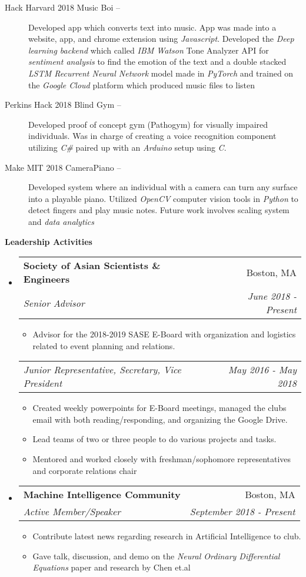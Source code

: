 \documentclass[letterpaper, 8pt]{extarticle}
\makeatletter
\newcommand{\resitem}[1]{\item #1 \vspace{-2pt}}
\newcommand{\resheading}[1]{{\large \colorbox{mygrey}{\begin{minipage}{0.99\textwidth}{\textbf{#1 \vphantom{p\^{E}}}}\end{minipage}}}}
\newcommand{\ressubheading}[4]{
\begin{tabular*}{7.40in}{l@{\extracolsep{\fill}}r}
		\textbf{#1} & #2 \\
		\textit{#3} & \textit{#4} \\
\end{tabular*}\vspace{-6pt}}
\newcommand{\rehead}[2]{
\begin{tabular*}{7.40in}{l@{\extracolsep{\fill}}r}
        \textit{#1} & \textit{#2} \\
\end{tabular*}\vspace{-6pt}}
\makeatother
\begin{document}
\begin{description}
\item[Hack Harvard 2018 Music Boi --] Developed app which converts text into music. App was made into a website, app, and chrome extension using \emph{Javascript}. Developed the \emph{Deep learning backend} which called \emph{IBM Watson} Tone Analyzer API for \emph{sentiment analysis} to find the emotion of the text and a double stacked \emph{LSTM Recurrent Neural Network} model made in \emph{PyTorch} and trained on the \emph{Google Cloud} platform which produced music files to listen

\item[Perkins Hack 2018 Blind Gym --]  Developed proof of concept gym (Pathogym) for visually impaired individuals. Was in charge of creating a voice recognition component utilizing \emph{C\#} paired up with an \emph{Arduino} setup using \emph{C}.

\item[Make MIT 2018 CameraPiano --] Developed system where an individual with a camera can turn any surface into a playable piano. Utilized \emph{OpenCV} computer vision tools in \emph{Python} to detect fingers and play music notes. Future work involves scaling system and \emph{data analytics}

\end{description}


\resheading{Leadership Activities}
\begin{itemize}
    \item 	\ressubheading{Society of Asian Scientists \& Engineers}{Boston, MA}{Senior Advisor}{June 2018 - Present}
    \begin{itemize} 
        \item Advisor for the 2018-2019 SASE E-Board with organization and logistics related to event planning and relations.
    \end{itemize} \vspace{-6pt}
    \rehead{Junior Representative, Secretary, Vice President}{May 2016 - May 2018}
    \begin{itemize} 
        \resitem{Created weekly powerpoints for E-Board meetings, managed the clubs email with both reading/responding, and organizing the Google Drive.}
        \resitem{Lead teams of two or three people to do various projects and tasks.}
        \resitem{Mentored and worked closely with freshman/sophomore representatives and corporate relations chair}
    \end{itemize}
    \item \ressubheading{Machine Intelligence Community}{Boston, MA}{Active Member/Speaker}{September 2018 - Present}
    \begin{itemize}
        \resitem{Contribute latest news regarding research in Artificial Intelligence to club.}
        \resitem{Gave talk, discussion, and demo on the \textit{Neural Ordinary Differential Equations} paper and research by Chen et.al}
    \end{itemize}
\end{itemize}
\end{document}
